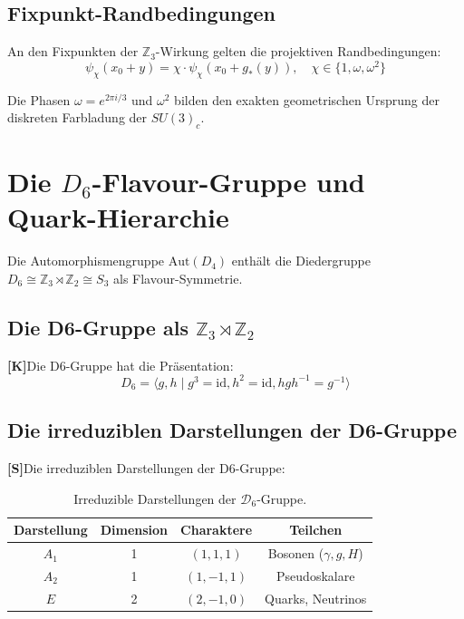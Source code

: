 \documentclass[11pt,a4paper]{article}
\newcommand{\Dsix}{\mathcal{D}_6}
\newcommand{\Kstatus}{\textbf{[K]}}
\newcommand{\Sstatus}{\textbf{[S]}}
\begin{document}
	\subsection{Fixpunkt-Randbedingungen}
	
	An den Fixpunkten der $\mathbb{Z}_3$-Wirkung gelten die projektiven Randbedingungen:
	\begin{equation}
		\psi_{\chi}(x_0 + y) = \chi \cdot \psi_{\chi}(x_0 + g_*(y)), \quad \chi \in \{1, \omega, \omega^2\}
	\end{equation}
	
	Die Phasen $\omega = e^{2\pi i / 3}$ und $\omega^2$ bilden den exakten geometrischen Ursprung der diskreten Farbladung der $SU(3)_c$.
	
	\section{Die $D_6$-Flavour-Gruppe und Quark-Hierarchie}
	
	Die Automorphismengruppe $\text{Aut}(D_4)$ enthält die Diedergruppe $D_6 \cong \mathbb{Z}_3 \rtimes \mathbb{Z}_2 \cong S_3$ als Flavour-Symmetrie.
	
	\subsection{Die D6-Gruppe als $\mathbb{Z}_3 \rtimes \mathbb{Z}_2$}
	
	\Kstatus Die D6-Gruppe hat die Präsentation:
	\begin{equation}
		D_6 = \langle g, h \mid g^3 = \text{id}, h^2 = \text{id}, h g h^{-1} = g^{-1} \rangle
	\end{equation}
	
	\subsection{Die irreduziblen Darstellungen der D6-Gruppe}
	
	\Sstatus Die irreduziblen Darstellungen der D6-Gruppe:
	
	\begin{table}[h!]
		\centering
		\caption{Irreduzible Darstellungen der $\Dsix$-Gruppe.}
		\label{tab:d6_reps}
		\begin{tabular}{c c c c}
			\toprule
			\textbf{Darstellung} & \textbf{Dimension} & \textbf{Charaktere} & \textbf{Teilchen} \\
			\midrule
			$A_1$ & 1 & $(1,1,1)$ & Bosonen ($\gamma, g, H$) \\
			$A_2$ & 1 & $(1,-1,1)$ & Pseudoskalare \\
			$E$ & 2 & $(2,-1,0)$ & Quarks, Neutrinos \\
			\bottomrule
		\end{tabular}
	\end{table}
	
\end{document}
